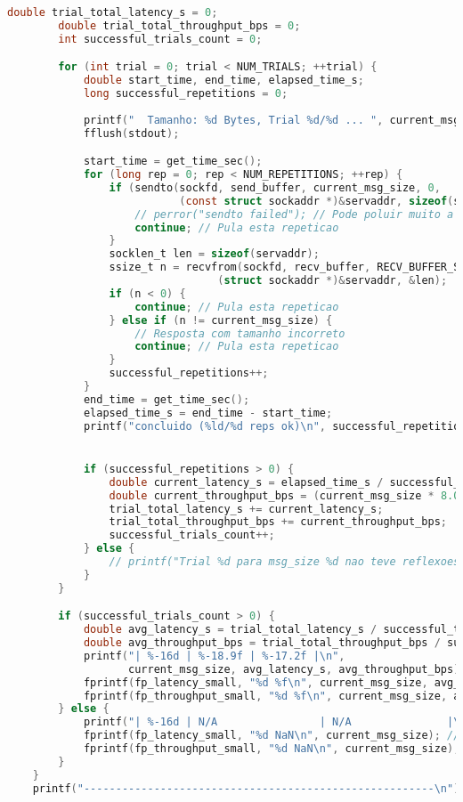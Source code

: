 \begin{lstlisting}[language=C, caption={Código fonte do Testador UDP (tester\_udp.c)}, label={lst:tester_udp}]
        double trial_total_latency_s = 0;
        double trial_total_throughput_bps = 0;
        int successful_trials_count = 0;

        for (int trial = 0; trial < NUM_TRIALS; ++trial) {
            double start_time, end_time, elapsed_time_s;
            long successful_repetitions = 0;
            
            printf("  Tamanho: %d Bytes, Trial %d/%d ... ", current_msg_size, trial + 1, NUM_TRIALS);
            fflush(stdout);

            start_time = get_time_sec();
            for (long rep = 0; rep < NUM_REPETITIONS; ++rep) {
                if (sendto(sockfd, send_buffer, current_msg_size, 0,
                           (const struct sockaddr *)&servaddr, sizeof(servaddr)) < 0) {
                    // perror("sendto failed"); // Pode poluir muito a saida
                    continue; // Pula esta repeticao
                }
                socklen_t len = sizeof(servaddr);
                ssize_t n = recvfrom(sockfd, recv_buffer, RECV_BUFFER_SIZE, 0,
                                 (struct sockaddr *)&servaddr, &len);
                if (n < 0) {
                    continue; // Pula esta repeticao
                } else if (n != current_msg_size) {
                    // Resposta com tamanho incorreto
                    continue; // Pula esta repeticao
                }
                successful_repetitions++;
            }
            end_time = get_time_sec();
            elapsed_time_s = end_time - start_time;
            printf("concluido (%ld/%d reps ok)\n", successful_repetitions, NUM_REPETITIONS);


            if (successful_repetitions > 0) {
                double current_latency_s = elapsed_time_s / successful_repetitions;
                double current_throughput_bps = (current_msg_size * 8.0) / current_latency_s;
                trial_total_latency_s += current_latency_s;
                trial_total_throughput_bps += current_throughput_bps;
                successful_trials_count++;
            } else {
                // printf("Trial %d para msg_size %d nao teve reflexoes bem sucedidas.\n", trial + 1, current_msg_size);
            }
        }

        if (successful_trials_count > 0) {
            double avg_latency_s = trial_total_latency_s / successful_trials_count;
            double avg_throughput_bps = trial_total_throughput_bps / successful_trials_count;
            printf("| %-16d | %-18.9f | %-17.2f |\n",
                   current_msg_size, avg_latency_s, avg_throughput_bps);
            fprintf(fp_latency_small, "%d %f\n", current_msg_size, avg_latency_s);
            fprintf(fp_throughput_small, "%d %f\n", current_msg_size, avg_throughput_bps);
        } else {
            printf("| %-16d | N/A                | N/A               |\n", current_msg_size);
            fprintf(fp_latency_small, "%d NaN\n", current_msg_size); // Gnuplot/Python podem lidar com NaN
            fprintf(fp_throughput_small, "%d NaN\n", current_msg_size);
        }
    }
    printf("-------------------------------------------------------\n");


\end{lstlisting}
